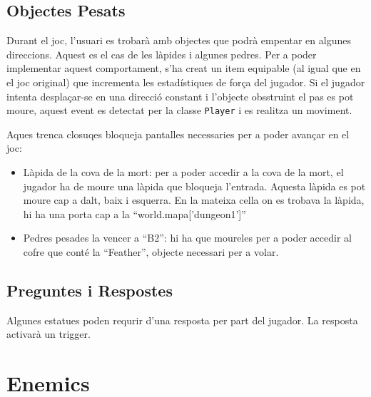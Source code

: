 \documentclass[a4paper,12pt]{article}
\begin{document}
\subsection{Objectes Pesats}
Durant el joc, l'usuari es trobarà amb objectes que podrà empentar en algunes direccions. Aquest es el cas de les làpides i algunes pedres. Per a poder implementar aquest comportament, s'ha creat un item equipable (al igual que en el joc original) que incrementa les estadístiques de força del jugador. Si el jugador intenta desplaçar-se en una direcció constant i l'objecte obsstruint el pas es pot moure, aquest event es detectat per la classe \texttt{Player} i es realitza un moviment. 

Aques trenca closuqes bloqueja pantalles necessaries per a poder avançar en el joc:
\begin{itemize}
    \item Làpida de la cova de la mort: per a poder accedir a la cova de la mort, el jugador ha de moure una làpida que bloqueja l'entrada. Aquesta làpida es pot moure cap a dalt, baix i esquerra. En la mateixa cella on es trobava la làpida, hi ha una porta cap a la ``world.mapa['dungeon1']''
    \item Pedres pesades la vencer a ``B2'': hi ha que moureles per a poder accedir al cofre que conté la ``Feather'', objecte necessari per a volar.
\end{itemize}

\subsection{Preguntes i Respostes}
Algunes estatues poden requrir d'una resposta per part del jugador. La resposta activarà un trigger.


\section{Enemics}
\end{document}
